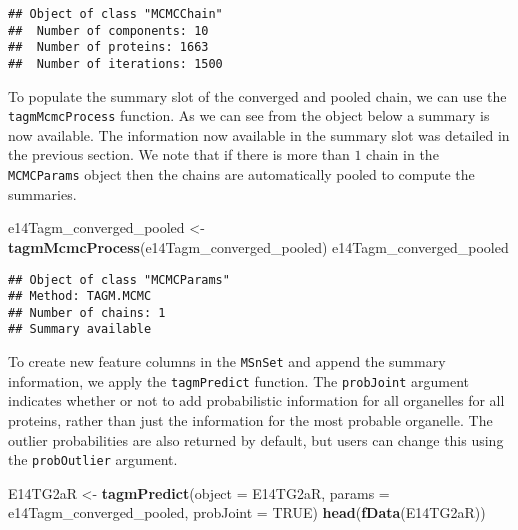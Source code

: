 \documentclass[]{article}
\newenvironment{Shaded}{\begin{snugshade}}{\end{snugshade}}
\newcommand{\KeywordTok}[1]{\textcolor[rgb]{0.13,0.29,0.53}{\textbf{{#1}}}}
\newcommand{\DataTypeTok}[1]{\textcolor[rgb]{0.13,0.29,0.53}{{#1}}}
\newcommand{\StringTok}[1]{\textcolor[rgb]{0.31,0.60,0.02}{{#1}}}
\newcommand{\OtherTok}[1]{\textcolor[rgb]{0.56,0.35,0.01}{{#1}}}
\newcommand{\NormalTok}[1]{{#1}}
\begin{document}
\begin{verbatim}
## Object of class "MCMCChain"
##  Number of components: 10 
##  Number of proteins: 1663 
##  Number of iterations: 1500
\end{verbatim}

To populate the summary slot of the converged and pooled chain, we can
use the \texttt{tagmMcmcProcess} function. As we can see from the object
below a summary is now available. The information now available in the
summary slot was detailed in the previous section. We note that if there
is more than \(1\) chain in the \texttt{MCMCParams} object then the
chains are automatically pooled to compute the summaries.

\begin{Shaded}
\begin{Highlighting}[]
\NormalTok{e14Tagm_converged_pooled <-}\StringTok{ }\KeywordTok{tagmMcmcProcess}\NormalTok{(e14Tagm_converged_pooled)}
\NormalTok{e14Tagm_converged_pooled}
\end{Highlighting}
\end{Shaded}

\begin{verbatim}
## Object of class "MCMCParams"
## Method: TAGM.MCMC 
## Number of chains: 1 
## Summary available
\end{verbatim}

To create new feature columns in the \texttt{MSnSet} and append the
summary information, we apply the \texttt{tagmPredict} function. The
\texttt{probJoint} argument indicates whether or not to add
probabilistic information for all organelles for all proteins, rather
than just the information for the most probable organelle. The outlier
probabilities are also returned by default, but users can change this
using the \texttt{probOutlier} argument.

\begin{Shaded}
\begin{Highlighting}[]
\NormalTok{E14TG2aR <-}\StringTok{ }\KeywordTok{tagmPredict}\NormalTok{(}\DataTypeTok{object =} \NormalTok{E14TG2aR,}
                        \DataTypeTok{params =} \NormalTok{e14Tagm_converged_pooled,}
                        \DataTypeTok{probJoint =} \OtherTok{TRUE}\NormalTok{)}
\KeywordTok{head}\NormalTok{(}\KeywordTok{fData}\NormalTok{(E14TG2aR))}
\end{Highlighting}
\end{Shaded}
\end{document}

